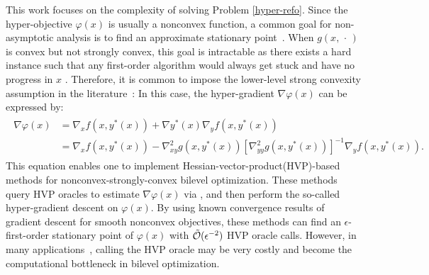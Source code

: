 \documentclass[twoside,11pt]{article}
\begin{document}
This work focuses on the complexity of solving Problem \ref{hyper-refo}.
Since the hyper-objective $\varphi(x)$ is usually a nonconvex function, 
a common goal for non-asymptotic analysis is to find an approximate
stationary point~\citep{carmon2020lower,carmon2021lower}. 
{When $g(x,\,\cdot\,)$ is convex but not strongly convex,  this goal is intractable as there exists a hard instance such that any first-order algorithm would always get stuck and have no progress in $x$ \citep[Theorem 3.2]{chen2024finding}.}
Therefore, it is common to impose the lower-level strong convexity assumption in the literature~\citep{dagreou2022framework,ji2021bilevel,chen2021closing,khanduri2021near,hong2023two}:
In this case,
the hyper-gradient $\nabla \varphi(x)$ can be expressed by:
\begin{align} \label{hyper-grad} 
\begin{split}
    \nabla \varphi(x) 
    &= 
    \nabla_x f(x,y^*(x)) + \nabla y^*(x) \nabla_y f(x,y^*(x)) \\
    &=
    \nabla_x f(x,y^*(x)) - \nabla_{xy}^2 g(x,y^*(x)) [ \nabla_{yy}^2 g(x,y^*(x))]^{-1} \nabla_y f(x,y^*(x)).
\end{split}
\end{align}
This equation enables one to implement
Hessian-vector-product(HVP)-based methods \citep{ji2021bilevel,ghadimi2018approximation} for nonconvex-strongly-convex bilevel optimization. 
These methods query 
HVP oracles to 
estimate $\nabla \varphi(x)$ via , and then
perform the so-called hyper-gradient descent on $\varphi(x)$. 
By using known convergence results of gradient descent for smooth nonconvex objectives, these methods can find an $\epsilon$-first-order stationary point of $\varphi(x)$ with $\tilde {{\mathcal{O}}}(\epsilon^{-2})$ HVP oracle calls.
However, in many applications~\citep{sow2022convergence,song2019maml,finn2017model,nichol2018first}, calling the HVP oracle may be very costly and become the computational bottleneck in bilevel optimization.
\end{document}
